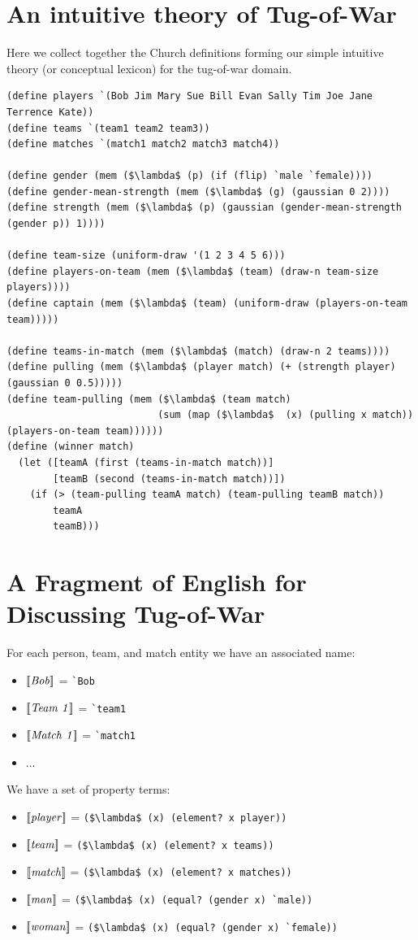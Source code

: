 \documentclass[pdfextras]{handbook}
\newcommand{\llbracket}{\ensuremath{\left [\!\left [}}%
\newcommand{\rrbracket}{\ensuremath{\right ]\!\right ]}}
\providecommand{\sv}[1]{\ensuremath{\llbracket \mathit{#1} \rrbracket}}
\newcommand{\denot}[1]{\ensuremath{\llbracket \mathit{#1} \rrbracket}}
\begin{document}
\appendix

\section{An intuitive theory of Tug-of-War}
\label{tow}
Here we collect together the Church definitions forming our simple intuitive theory (or conceptual lexicon) for the tug-of-war domain.
 \begin{lstlisting}[mathescape]
(define players `(Bob Jim Mary Sue Bill Evan Sally Tim Joe Jane Terrence Kate))
(define teams `(team1 team2 team3))
(define matches `(match1 match2 match3 match4))

(define gender (mem ($\lambda$ (p) (if (flip) `male `female))))
(define gender-mean-strength (mem ($\lambda$ (g) (gaussian 0 2))))
(define strength (mem ($\lambda$ (p) (gaussian (gender-mean-strength (gender p)) 1))))

(define team-size (uniform-draw '(1 2 3 4 5 6)))
(define players-on-team (mem ($\lambda$ (team) (draw-n team-size players))))
(define captain (mem ($\lambda$ (team) (uniform-draw (players-on-team team)))))

(define teams-in-match (mem ($\lambda$ (match) (draw-n 2 teams))))
(define pulling (mem ($\lambda$ (player match) (+ (strength player) (gaussian 0 0.5)))))
(define team-pulling (mem ($\lambda$ (team match) 
                          (sum (map ($\lambda$  (x) (pulling x match)) (players-on-team team))))))
(define (winner match) 
  (let ([teamA (first (teams-in-match match))]
        [teamB (second (teams-in-match match))])
    (if (> (team-pulling teamA match) (team-pulling teamB match))
        teamA
        teamB)))
\end{lstlisting}

\section{A Fragment of English for Discussing Tug-of-War}
\label{tow-lexicon}

For each person, team, and match entity we have an associated name:
\begin{itemize}
\item \denot{Bob} = \lstinline{`Bob}
\item \denot{Team\ 1} = \lstinline{`team1}
\item \denot{Match\ 1} = \lstinline{`match1}
\item ...
\end{itemize}

We have a set of property terms:
\begin{itemize}
\item \sv{player} = \lstinline[mathescape]{($\lambda$ (x) (element? x player))}  
\item \sv{team} = \lstinline[mathescape]{($\lambda$ (x) (element? x teams))}
\item \sv{match} = \lstinline[mathescape]{($\lambda$ (x) (element? x matches))}
\item \sv{man} = \lstinline[mathescape]{($\lambda$ (x) (equal? (gender x) `male))}
\item \sv{woman} = \lstinline[mathescape]{($\lambda$ (x) (equal? (gender x) `female))}
\end{itemize}
\end{document}
